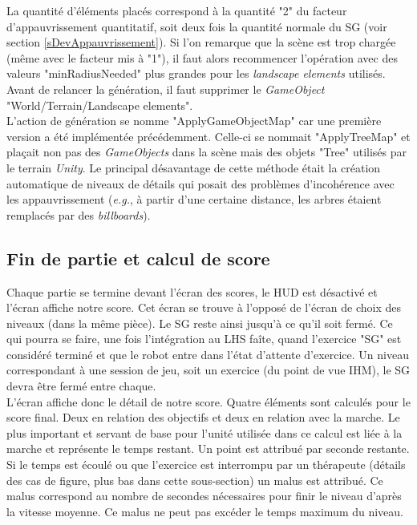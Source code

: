 		La quantité d'éléments placés correspond à la quantité "2" du facteur d'appauvrissement quantitatif, soit deux fois la quantité normale du SG (voir section \ref{sDevAppauvrissement}). Si l'on remarque que la scène est trop chargée (même avec le facteur mis à "1"), il faut alors recommencer l'opération avec des valeurs "minRadiusNeeded" plus grandes pour les \textit{landscape elements} utilisés. Avant de relancer la génération, il faut supprimer le \textit{GameObject} "World/Terrain/Landscape elements".
		\\
		
		L'action de génération se nomme "ApplyGameObjectMap" car une première version a été implémentée précédemment. Celle-ci se nommait "ApplyTreeMap" et plaçait non pas des \textit{GameObjects} dans la scène mais des objets "Tree" utilisés par le terrain \textit{Unity}. Le principal désavantage de cette méthode était la création automatique de niveaux de détails qui posait des problèmes d'incohérence avec les appauvrissement (\textit{e.g.}, à partir d'une certaine distance, les arbres étaient remplacés par des \textit{billboards}).	
	
	\subsection*{Fin de partie et calcul de score}
		Chaque partie se termine devant l'écran des scores, le HUD est désactivé et l'écran affiche notre score. Cet écran se trouve à l'opposé de l'écran de choix des niveaux (dans la même pièce). Le SG reste ainsi jusqu'à ce qu'il soit fermé. Ce qui pourra se faire, une fois l'intégration au LHS faîte, quand l'exercice "SG" est considéré terminé et que le robot entre dans l'état d'attente d'exercice. Un niveau correspondant à une session de jeu, soit un exercice (du point de vue IHM), le SG devra être fermé entre chaque.%
		\\
		
		L'écran affiche donc le détail de notre score. Quatre éléments sont calculés pour le score final. Deux en relation des objectifs et deux en relation avec la marche. Le plus important et servant de base pour l'unité utilisée dans ce calcul est liée à la marche et représente le temps restant. Un point est attribué par seconde restante. Si le temps est écoulé ou que l'exercice est interrompu par un thérapeute (détails des cas de figure, plus bas dans cette sous-section) un malus est attribué. Ce malus correspond au nombre de secondes nécessaires pour finir le niveau d'après la vitesse moyenne. Ce malus ne peut pas excéder le temps maximum du niveau.
		
